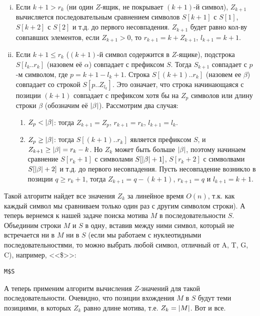 \documentclass[letterpaper, 11pt]{article}
\DeclarePairedDelimiter{\abs}{\lvert}{\rvert}
\begin{document}
\begin{enumerate}[(i)]
\item
Если $k + 1 > r_k$ (ни один $Z$-ящик, не покрывает $(k+1)$-й символ), $Z_{k+1}$ вычисляется последовательным сравнением символов $S[k+1]$ с $S[1]$, $S[k+2]$ с $S[2]$ и т.д. до первого несовпадения. $Z_{k+1}$ будет равно кол-ву совпавших элементов, если $Z_{k+1} > 0$, то $r_{k+1} = k + Z_{k+1}$, $l_{k+1} = k + 1$.
\item
Если $k + 1 \leq r_k$ ($(k+1)$-й символ содержится в $Z$-ящике), подстрока $S[l_k..r_k]$ (назовем её $\alpha$) совпадает с префиксом $S$. Тогда $S_{k+1}$ совпадает с $p$-м символом, где $p = k + 1 - l_k + 1$. Строка $S[(k+1)..r_k]$ (назовем ее $\beta$) совпадает со строкой $S[p..Z_{l_k}]$. Это означает, что строка начинающаяся с позиции $(k+1)$ совпадает с префиксом хотя бы на $Z_{p}$ символов или длину строки $\beta$ (обозначим её $\abs{\beta}$). Рассмотрим два случая:
\begin{enumerate}
 \item
 $Z_{p} < \abs{\beta}$: тогда $Z_{k+1} = Z_{p}$, $r_{k+1} = r_{k}$, $l_{k+1} = l_k$.
 \item
 $Z_{p} \geq \abs{\beta}$: тогда $S[(k+1)..r_k]$ является префиксом $S$, и $Z_{k+1} \geq \abs{\beta} = r_k - k$. Но $Z_k$ может быть больше $\abs{\beta}$, поэтому начинаем сравнение $S[r_k + 1]$ с символами $S[\abs{\beta} + 1]$, $S[r_k + 2]$ с символвами $S[\abs{\beta} + 2]$ и т.д. до первого несовпадения. Пусть несовпадение возникло в позиции $q \geq r_k + 1$, тогда $Z_{k+1} = q - (k +1)$, $r_{k+1} = q$ и $l_{k+1} = k + 1$.
\end{enumerate}
\end{enumerate}
\par
Такой алгоритм найдет все значения $Z_k$ за линейное время $O(n)$, т.к. как каждый символ мы сравниваем только один раз с другим символом строки). А теперь вернемся к нашей задаче поиска мотива $M$ в последовательности $S$. Объединим строки $M$ и $S$ в одну, вставив между ними символ, который не встречается ни в $M$ ни в $S$ (если мы работаем с нуклеотидными последовательностями, то можно выбрать любой символ, отличный от A, T, G, C), например, <<\$>>:
\begin{verbatim}
M$S
\end{verbatim}
\par
А теперь применим алгоритм вычисления $Z$-значений для такой последовательности. Очевидно, что позиции вхождения $M$ в $S$ будут теми позициями, в которых $Z_k$ равно длине мотива, т.е. $Z_k = \abs{M}$. Вот и все.
\end{document}
